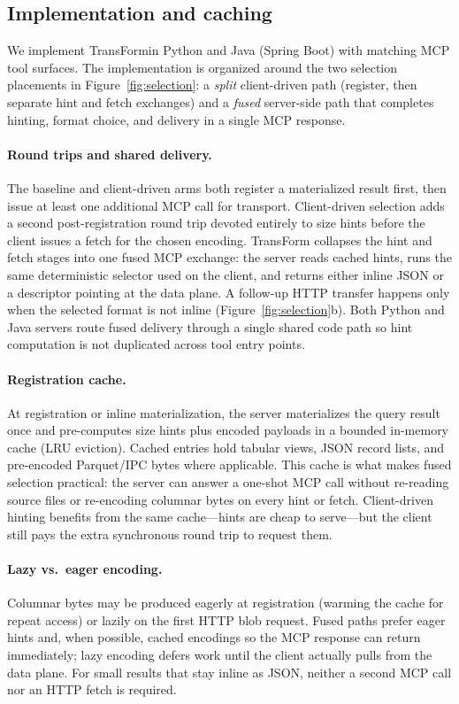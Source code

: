 \documentclass[sigconf, nonacm]{acmart}
\newcommand{\system}{TransForm}
\begin{document}
\subsection{Implementation and caching}
\label{sec:impl}

We implement \system in Python and Java (Spring Boot) with matching MCP tool surfaces. The implementation is organized around the two selection placements in Figure~\ref{fig:selection}: a \emph{split} client-driven path (register, then separate hint and fetch exchanges) and a \emph{fused} server-side path that completes hinting, format choice, and delivery in a single MCP response.

\paragraph{Round trips and shared delivery.}
The baseline and client-driven arms both register a materialized result first, then issue at least one additional MCP call for transport. Client-driven selection adds a second post-registration round trip devoted entirely to size hints before the client issues a fetch for the chosen encoding. TransForm collapses the hint and fetch stages into one fused MCP exchange: the server reads cached hints, runs the same deterministic selector used on the client, and returns either inline JSON or a descriptor pointing at the data plane. A follow-up HTTP transfer happens only when the selected format is not inline (Figure~\ref{fig:selection}b). Both Python and Java servers route fused delivery through a single shared code path so hint computation is not duplicated across tool entry points.

\paragraph{Registration cache.}
At registration or inline materialization, the server materializes the query result once and pre-computes size hints plus encoded payloads in a bounded in-memory cache (LRU eviction). Cached entries hold tabular views, JSON record lists, and pre-encoded Parquet/IPC bytes where applicable. This cache is what makes fused selection practical: the server can answer a one-shot MCP call without re-reading source files or re-encoding columnar bytes on every hint or fetch. Client-driven hinting benefits from the same cache---hints are cheap to serve---but the client still pays the extra synchronous round trip to request them.

\paragraph{Lazy vs.\ eager encoding.}
Columnar bytes may be produced eagerly at registration (warming the cache for repeat access) or lazily on the first HTTP blob request. Fused paths prefer eager hints and, when possible, cached encodings so the MCP response can return immediately; lazy encoding defers work until the client actually pulls from the data plane. For small results that stay inline as JSON, neither a second MCP call nor an HTTP fetch is required.
\end{document}

